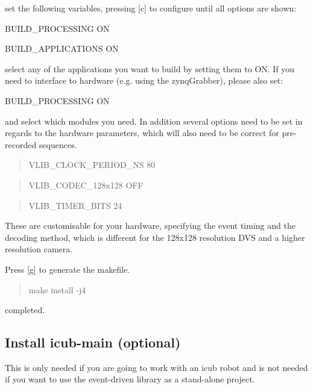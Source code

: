 set the following variables, pressing \mbox{[}c\mbox{]} to configure until all options are shown\+:


\begin{DoxyItemize}
\item B\+U\+I\+L\+D\+\_\+\+P\+R\+O\+C\+E\+S\+S\+I\+NG ON
\item B\+U\+I\+L\+D\+\_\+\+A\+P\+P\+L\+I\+C\+A\+T\+I\+O\+NS ON
\end{DoxyItemize}

select any of the applications you want to build by setting them to ON. If you need to interface to hardware (e.\+g. using the zynq\+Grabber), please also set\+:


\begin{DoxyItemize}
\item B\+U\+I\+L\+D\+\_\+\+P\+R\+O\+C\+E\+S\+S\+I\+NG ON
\end{DoxyItemize}

and select which modules you need. In addition several options need to be set in regards to the hardware parameters, which will also need to be correct for pre-\/recorded sequences.

\begin{quote}
V\+L\+I\+B\+\_\+\+C\+L\+O\+C\+K\+\_\+\+P\+E\+R\+I\+O\+D\+\_\+\+NS 80 \end{quote}


\begin{quote}
V\+L\+I\+B\+\_\+\+C\+O\+D\+E\+C\+\_\+128x128 O\+FF \end{quote}


\begin{quote}
V\+L\+I\+B\+\_\+\+T\+I\+M\+E\+R\+\_\+\+B\+I\+TS 24 \end{quote}


These are customisable for your hardware, specifying the event timing and the decoding method, which is different for the 128x128 resolution D\+VS and a higher resolution camera.

Press \mbox{[}g\mbox{]} to generate the makefile.

\begin{quote}
make install -\/j4 \end{quote}


completed.

\subsection*{Install icub-\/main (optional)}

This is only needed if you are going to work with an icub robot and is not needed if you want to use the event-\/driven library as a stand-\/alone project.

